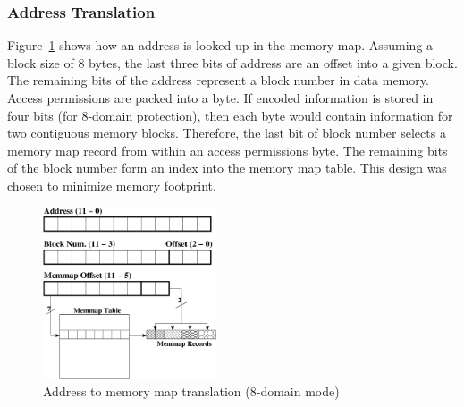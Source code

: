 \subsubsection{Address Translation}
\label{sec:memtrans}
%
Figure~\ref{fig:addr_memmap_translate} shows how an address is looked up in
the memory map.
%
Assuming a block size of 8 bytes, the last three bits of address are an
offset into a given block.
%
The remaining bits of the address represent a block number in data memory.
%
Access permissions are packed into a byte.
%
If encoded information is stored in four bits (for 8-domain
protection), then each byte would contain information for two
contiguous memory blocks.
%
Therefore, the last bit of block number selects a memory map record
from within an access permissions byte.
%
The remaining bits of the block number form an index into the memory map table.
%
This design was chosen to minimize memory footprint.
%
\begin{figure}[htbp]
  \centering
  \includegraphics[height=2.0in,
  keepaspectratio=true]{figures/memaddrtrans.eps}
  \caption{Address to memory map translation (8-domain mode)}
  \label{fig:addr_memmap_translate}
\end{figure}
%
